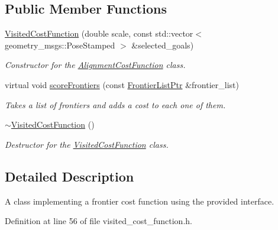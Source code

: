 \subsection*{\-Public \-Member \-Functions}
\begin{DoxyCompactItemize}
\item 
\hyperlink{classpandora__exploration_1_1_visited_cost_function_a1b27e0e529b72f00f839be39347343f5}{\-Visited\-Cost\-Function} (double scale, const std\-::vector$<$ geometry\-\_\-msgs\-::\-Pose\-Stamped $>$ \&selected\-\_\-goals)
\begin{DoxyCompactList}\small\item\em \-Constructor for the \hyperlink{classpandora__exploration_1_1_alignment_cost_function}{\-Alignment\-Cost\-Function} class. \end{DoxyCompactList}\item 
virtual void \hyperlink{classpandora__exploration_1_1_visited_cost_function_a01607b04d8f76e004ff6089fd31a6a3e}{score\-Frontiers} (const \hyperlink{namespacepandora__exploration_a6f3b1959fca391e2ef3ac46b6e96be7a}{\-Frontier\-List\-Ptr} \&frontier\-\_\-list)
\begin{DoxyCompactList}\small\item\em \-Takes a list of frontiers and adds a cost to each one of them. \end{DoxyCompactList}\item 
\hyperlink{classpandora__exploration_1_1_visited_cost_function_a11232018d47b5ea679399db0128254c0}{$\sim$\-Visited\-Cost\-Function} ()
\begin{DoxyCompactList}\small\item\em \-Destructor for the \hyperlink{classpandora__exploration_1_1_visited_cost_function}{\-Visited\-Cost\-Function} class. \end{DoxyCompactList}\end{DoxyCompactItemize}


\subsection{\-Detailed \-Description}
\-A class implementing a frontier cost function using the provided interface. 

\-Definition at line 56 of file visited\-\_\-cost\-\_\-function.\-h.




